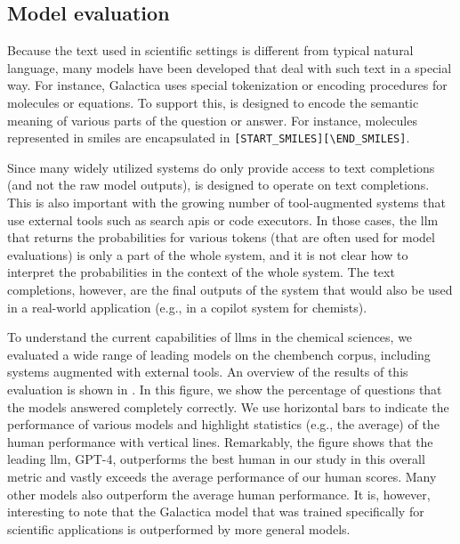 \documentclass[11pt, oneside]{article}
\begin{document}
\subsection{Model evaluation}

Because the text used in scientific settings is different from typical natural language, many models have been developed that deal with such text in a special way.
For instance, Galactica\cite{taylor2022galactica} uses special tokenization or encoding procedures for molecules or equations.
To support this, \chembench is designed to encode the semantic meaning of various parts of the question or answer.  
For instance, molecules represented in \gls{smiles} are encapsulated in \texttt{[START\_SMILES][\textbackslash END\_SMILES]}.

Since many widely utilized systems do only provide access to text completions (and not the raw model outputs), \chembench is designed to operate on text completions.
This is also important with the growing number of tool-augmented systems that use external tools such as search \glspl{api} or code executors.\cite{schick2024toolformer, karpas2022mrkl, yao2022react}
In those cases, the \gls{llm} that returns the probabilities for various tokens (that are often used for model evaluations\cite{Fourrier_Habib_Launay_Wolf}) is only a part of the whole system, and it is not clear how to interpret the probabilities in the context of the whole system.
The text completions, however, are the final outputs of the system that would also be used in a real-world application (e.g., in a copilot system for chemists).

To understand the current capabilities of \glspl{llm} in the chemical sciences, we evaluated a wide range of leading models\cite{Huggingface} on the chembench corpus, including systems augmented with external tools.
An overview of the results of this evaluation is shown in . 
In this figure, we show the percentage of questions that the models answered completely correctly.
We use horizontal bars to indicate the performance of various models and highlight statistics (e.g., the average) of the human performance with vertical lines.
Remarkably, the figure shows that the leading \gls{llm}, GPT-4, outperforms the best human in our study in this overall metric and vastly exceeds the average performance of our human scores.
Many other models also outperform the average human performance. It is, however, interesting to note that the Galactica model that was trained specifically for scientific applications is outperformed by more general models.
\end{document}

